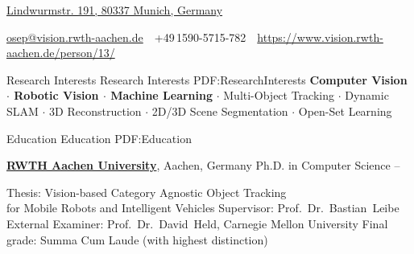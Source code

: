 \documentclass[letterpaper,MMMyyyy,nonstopmode]{simpleresumecv}
\newcommand{\CVAuthor}{Aljoša Ošep}
\newcommand{\CVWebpage}{https://www.vision.rwth-aachen.de/person/13/}
\begin{document}

\Title{\CVAuthor}

\begin{SubTitle}
\href{https://www.google.com/maps/place/Karlsgraben+42,+52064+Aachen}
{Lindwurmstr. 191, 80337 Munich, Germany}
\par
\href{mailto:osep@vision.rwth-aachen.de}
{osep@vision.rwth-aachen.de}
\,\SubBulletSymbol\,
+49\,1590-5715-782
\,\SubBulletSymbol\,
\href{\CVWebpage}
{\url{\CVWebpage}}
\end{SubTitle}

\begin{Body}

\Section
{Research Interests}
{Research Interests}
{PDF:ResearchInterests}
\textbf{Computer Vision  $\cdot$ Robotic Vision  $\cdot$  Machine Learning} $\cdot$
Multi-Object Tracking $\cdot$ Dynamic SLAM $\cdot$ 3D Reconstruction $\cdot$ 2D/3D Scene Segmentation $\cdot$ Open-Set Learning 


\Section
{Education}
{Education}
{PDF:Education}


\Entry
\href{http://www.rwth-aachen.de}
{\textbf{RWTH Aachen University}},
Aachen, Germany
\Gap
\BulletItem
Ph.D. in Computer Science
\hfill
{} -- 
\begin{Detail}
\SubBulletItem
Thesis:
{Vision-based Category Agnostic Object Tracking \\for Mobile Robots and Intelligent Vehicles}
\SubBulletItem
Supervisor:
Prof.~Dr.~Bastian~Leibe
\SubBulletItem
External Examiner:
Prof.~Dr.~David~Held, Carnegie Mellon University
\SubBulletItem
Final grade: Summa Cum Laude (with highest distinction)
\end{Detail}
%


\end{Body}
\end{document}
